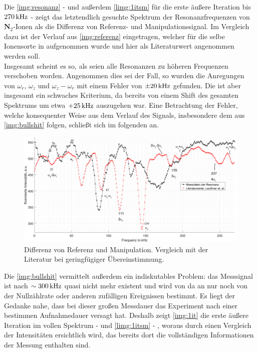 \documentclass[numbers=noenddot,a4paper,notitlepage,twoside,BCOR15mm]{scrartcl}
\newcommand{\fett}[1]{\textbf{#1}}
\begin{document}
			Die \autoref{img:resonanz} - und außerdem \autoref{limg:1itsm} für die erste äußere Iteration bis $\unit[270]{kHz}$ - zeigt das letztendlich gesuchte Spektrum der Resonanzfrequenzen von $\fett{N}_2$-Ionen als die Differenz von Referenz- und Manipulationssignal.  Im Vergleich dazu ist der Verlauf aus \autoref{img:referenz} eingetragen, welcher für die selbe Ionensorte in \cite{Paul-FalleREF} aufgenommen wurde und hier als Literaturwert angenommen werden soll.\\
			Insgesamt scheint es so, als seien alle Resonanzen zu höheren Frequenzen verschoben worden. Angenommen dies sei der Fall, so wurden die Anregungen von $\omega_r$, $\omega_z$ und $\omega_z-\omega_r$ mit einem Fehler von $\pm\unit[20]{kHz}$ gefunden. Die ist aber insgesamt ein schwaches Kriterium, da bereits von einem Shift des gesamten Spektrums um etwa $+\unit[25]{kHz}$ auszugehen war. Eine Betrachtung der Fehler, welche konsequenter Weise aus dem Verlauf des Signals, insbesondere dem aus \autoref{img:bullshit} folgen, schließt sich im folgenden an.

				\begin{figure}
					\includegraphics[width=\textwidth]{freq_diff_vergleich.png}
					\caption{Differenz von Referenz und Manipulation. Vergleich mit der Literatur \cite{Paul-FalleREF} bei geringfügiger Übereinstimmung.}\label{img:resonanz}
				\end{figure}

			Die \autoref{img:bullshit} vermittelt außerdem ein indiskutables Problem: das Messsignal ist nach $\sim\unit[300]{kHz}$ quasi nicht mehr existent und wird von da an nur noch von der Nullzählrate oder anderen zufälligen Ereignissen bestimmt. Es liegt der Gedanke nahe, dass bei dieser großen Messdauer das Experiment nach einer bestimmen Aufnahmedauer versagt hat. Deshalb zeigt \autoref{img:1it} die erste äußere Iteration im vollen Spektrum  - und \autoref{limg:1itsm} - , woraus durch einen Vergleich der Intensitäten ersichtlich wird, das bereits dort die vollständigen Informationen der Messung enthalten sind.
\end{document}
